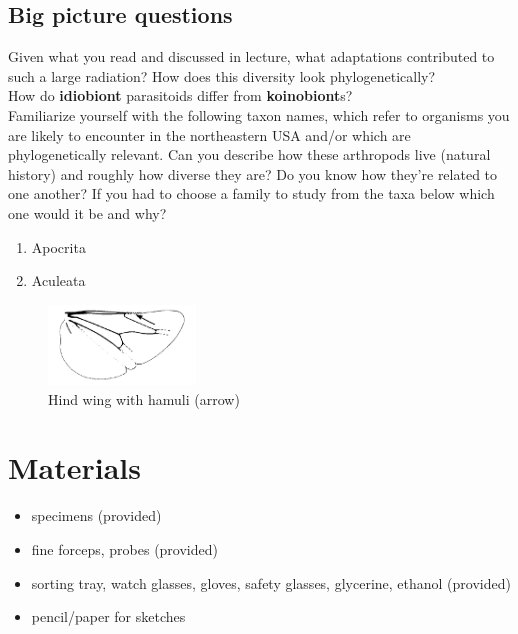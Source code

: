 \documentclass[letterpaper, 11pt]{article}
\begin{document}
\subsection*{Big picture questions}
Given what you read and discussed in lecture, what adaptations contributed to such a large radiation? How does this diversity look phylogenetically?\\

\noindent{}How do \textbf{idiobiont} parasitoids differ from \textbf{koinobiont}s?\\

\noindent{}Familiarize yourself with the following taxon names, which refer to organisms you are likely to encounter in the northeastern USA and/or which are phylogenetically relevant. Can you describe how these arthropods live (natural history) and roughly how diverse they are? Do you know how they're related to one another? If you had to choose a family to study from the taxa below which one would it be and why?

\begin{enumerate} 
\item Apocrita
\item Aculeata
\end{enumerate}

\begin{figure}[ht!]
  \centering
    \includegraphics[width=0.35\textwidth]{Hamuli}
  \caption{Hind wing with hamuli (arrow) \citep[][pg. 42]{goulet1993hymenoptera}}
  \label{fig:hamuli}
\end{figure}

\section*{Materials}
\begin{itemize}
\item specimens (provided)
\item fine forceps, probes (provided)
\item sorting tray, watch glasses, gloves, safety glasses, glycerine, ethanol (provided)
\item pencil/paper for sketches
\end{itemize}
\end{document}
